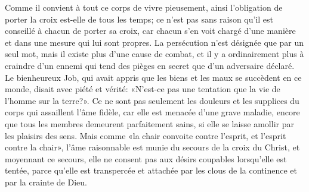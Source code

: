 Comme il convient à tout ce corps de vivre pieusement,
	ainsi l’obligation de porter la croix est-elle de tous les temps;
	ce n’est pas sans raison qu’il est conseillé à chacun de porter sa croix,
	car chacun s’en voit chargé
		d’une manière et dans une mesure qui lui sont propres.
La persécution n’est désignée que par un seul mot,
	mais il existe plus d’une cause de combat,
	et il y a ordinairement plus à craindre
		d’un ennemi qui tend des pièges en secret que d’un adversaire déclaré.
Le bienheureux Job,
	qui avait appris que les biens et les maux se succèdent en ce monde,
	disait avec piété et vérité:
	«N’est-ce pas une tentation que la vie de l’homme sur la terre?».
Ce ne sont pas seulement les douleurs et les supplices du corps
		qui assaillent l’âme fidèle,
	car elle est menacée d’une grave maladie,
	encore que tous les membres demeurent parfaitement sains,
	si elle se laisse amollir par les plaisirs des sens.
Mais comme «la chair convoite contre l’esprit, et l’esprit contre la chair»,
	l’âme raisonnable est munie du secours de la croix du Christ,
	et moyennant ce secours,
		elle ne consent pas aux désirs coupables lorsqu’elle est tentée,
	parce qu’elle est transpercée et attachée
		par les clous de la continence et par la crainte de Dieu.

